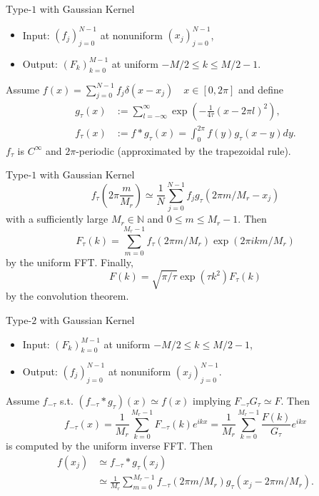 \documentclass{beamer}
\begin{document}
\begin{frame}{Type-$1$ with Gaussian Kernel}
  \begin{itemize}
    \item Input: $(f_{j})_{j=0}^{N-1}$ at nonuniform $(x_{j})_{j=0}^{N-1}$,
    \item Output: $(F_{k})_{k=0}^{M-1}$ at uniform $-M/2 \le k \le M/2-1$.
  \end{itemize}
  Assume $f(x) = \sum_{j=0}^{N-1}f_{j}\delta(x - x_{j}) \quad x \in [0,2\pi]$ and define
  \begin{align}
    g_{\tau}(x) &:= \sum_{l=-\infty}^{\infty}\exp\left(-\frac{1}{4\tau}(x-2\pi l)^2\right), \\
    f_{\tau}(x) &:= f\ast g_{\tau} (x)
      = \int_{0}^{2\pi} f(y)g_{\tau}(x-y) dy.
  \end{align}
  $f_{\tau}$ is $C^{\infty}$ and $2\pi$-periodic (approximated by the trapezoidal rule).
\end{frame}

\begin{frame}{Type-$1$ with Gaussian Kernel}
  \begin{equation}
      f_{\tau}(2\pi\frac{m}{M_{r}})
    \simeq \frac{1}{N}\sum_{j=0}^{N-1} f_{j} g_{\tau}(2\pi m/M_{r} - x_{j})
  \end{equation}
  with a sufficiently large $M_{r} \in \mathbb{N}$ and $0 \le m \le M_{r}-1$. Then
  \begin{equation}
    F_{\tau}(k) = \sum_{m=0}^{M_{r}-1}f_{\tau}(2\pi m/M_{r})\exp(2\pi ikm/M_{r})
  \end{equation}
  by the uniform FFT. Finally,
  \begin{equation}
    F(k) = \sqrt{\pi/\tau}\exp(\tau k^2)F_{\tau}(k)
  \end{equation}
  by the convolution theorem.
\end{frame}

\begin{frame}{Type-$2$ with Gaussian Kernel}
  \begin{itemize}
    \item Input: $(F_{k})_{k=0}^{M-1}$ at uniform $-M/2 \le k \le M/2-1$,
    \item Output: $(f_{j})_{j=0}^{N-1}$ at nonuniform $(x_{j})_{j=0}^{N-1}$.
  \end{itemize}
  Assume $f_{-\tau}$ s.t. $(f_{-\tau}\ast g_{\tau})(x) \simeq f(x)$ implying
  $F_{-\tau}G_{\tau} \simeq F$. Then
  \begin{equation}
      f_{-\tau}(x)
    = \frac{1}{M_{r}}\sum_{k=0}^{M_{r}-1} F_{-\tau}(k)e^{ikx}
    = \frac{1}{M_{r}}\sum_{k=0}^{M_{r}-1} \frac{F(k)}{G_{\tau}}e^{ikx}
  \end{equation}
  is computed by the uniform inverse FFT. Then
  \begin{align}
       f(x_{j})
    &\simeq f_{-\tau}\ast g_{\tau}(x_{j}) \\
    &\simeq \frac{1}{M_{r}}\sum_{m=0}^{M_{r}-1}f_{-\tau}(2\pi m/M_{r})g_{\tau}(x_{j} - 2\pi m/M_{r}).
  \end{align}
\end{frame}
\end{document}
